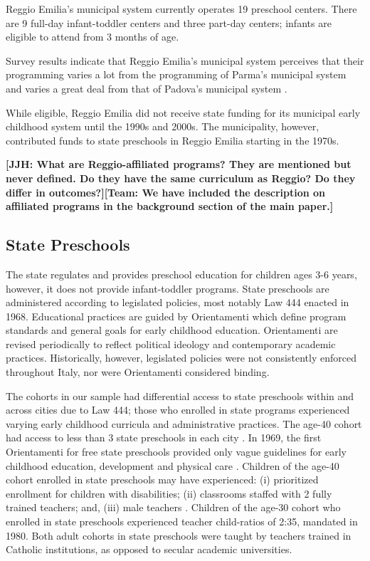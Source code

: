Reggio Emilia's municipal system currently operates 19 preschool centers. There are 9 full-day infant-toddler centers and three part-day centers; infants are eligible to attend from 3 months of age.

Survey results indicate that Reggio Emilia's municipal system perceives that their programming varies a lot from the programming of Parma's municipal system and varies a great deal from that of Padova's municipal system \citep{CEHD_2016_Historical-Analysis}.

While eligible, Reggio Emilia did not receive state funding for its municipal early childhood system until the 1990s and 2000s. The municipality, however, contributed funds to state preschools in Reggio Emilia starting in the 1970s.

\textbf{[JJH: What are Reggio-affiliated programs? They are mentioned but never defined. Do they have the same curriculum as Reggio? Do they differ in outcomes?][Team: We have included the description on affiliated programs in the background section of the main paper.]}

\subsection{State Preschools}

The state regulates and provides preschool education for children ages 3-6 years, however, it does not provide infant-toddler programs. State preschools are administered according to legislated policies, most notably Law 444 enacted in 1968. Educational practices are guided by Orientamenti which define program standards and general goals for early childhood education. Orientamenti are revised periodically to reflect political ideology and contemporary academic practices. Historically, however, legislated policies were not consistently enforced throughout Italy, nor were Orientamenti considered binding.

The cohorts in our sample had differential access to state preschools within and across cities due to Law 444; those who enrolled in state programs experienced varying early childhood curricula and administrative practices. The age-40 cohort had access to less than 3 state preschools in each city \citep{Reggio-Admin-data_1966-2006,Reggio-Annual-Journals_1994-2011,Padova-Admin-Data_1964-2011}. In 1969, the first Orientamenti for free state preschools provided only vague guidelines for early childhood education, development and physical care \citep{Corsaro_1996_Early-Edu,Hohnerlein_2015_Development-and-Diffusion}. Children of the age-40 cohort enrolled in state preschools may have experienced: (i) prioritized enrollment for children with disabilities; (ii) classrooms staffed with 2 fully trained teachers; and, (iii) male teachers \citep{Hohnerlein_2015_Development-and-Diffusion}. Children of the age-30 cohort who enrolled in state preschools experienced teacher child-ratios of 2:35, mandated in 1980. Both adult cohorts in state preschools were taught by teachers trained in Catholic institutions, as opposed to secular academic universities.

